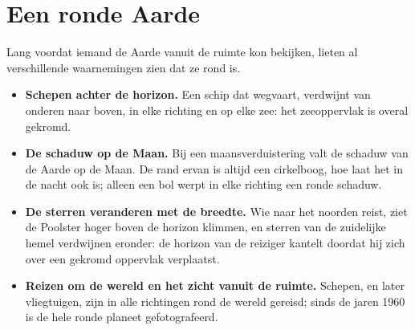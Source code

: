 \section{Een ronde Aarde}

Lang voordat iemand de Aarde vanuit de ruimte kon bekijken, lieten al
verschillende waarnemingen zien dat ze rond is.
\begin{itemize}
  \item \textbf{Schepen achter de horizon.} Een schip dat wegvaart, verdwijnt
        van onderen naar boven, in elke richting en op elke zee: het zeeoppervlak
        is overal gekromd.
  \item \textbf{De schaduw op de Maan.} Bij een maansverduistering valt de
        schaduw van de Aarde op de Maan. De rand ervan is altijd een cirkelboog,
        hoe laat het in de nacht ook is; alleen een bol werpt in elke richting
        een ronde schaduw.
  \item \textbf{De sterren veranderen met de breedte.} Wie naar het noorden
        reist, ziet de Poolster hoger boven de horizon klimmen, en sterren van
        de zuidelijke hemel verdwijnen eronder: de horizon van de reiziger
        kantelt doordat hij zich over een gekromd oppervlak verplaatst.
  \item \textbf{Reizen om de wereld en het zicht vanuit de ruimte.} Schepen, en
        later vliegtuigen, zijn in alle richtingen rond de wereld gereisd; sinds
        de jaren 1960 is de hele ronde planeet gefotografeerd.
\end{itemize}

